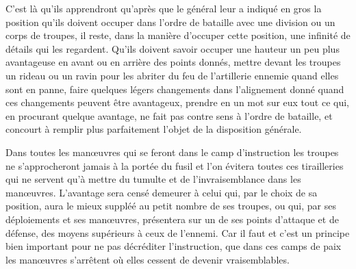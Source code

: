 \documentclass[french,twoside]{book} %
\begin{document}
C’est là qu’ils apprendront qu’après que le général leur a indiqué en gros la position qu’ils doivent occuper dans l’ordre de bataille avec une division ou un corps de troupes, il reste, dans la manière d’occuper cette position, une infinité de détails qui les regardent. Qu’ils doivent savoir occuper une hauteur un peu plus avantageuse en avant ou en arrière des points donnés, mettre devant les troupes un rideau ou un ravin pour les abriter du feu de l’artillerie ennemie quand elles sont en panne, faire quelques légers changements dans l’alignement donné quand ces changements peuvent être avantageux, prendre en un mot sur eux tout ce qui, en procurant quelque avantage, ne fait pas contre sens à l’ordre de bataille, et concourt à remplir plus parfaitement l’objet de la disposition générale.\par
Dans toutes les manœuvres qui se feront dans le camp d’instruction les troupes ne s’approcheront jamais à la portée du fusil et l’on évitera toutes ces tirailleries qui ne servent qu’à mettre du tumulte et de l’invraisemblance dans les manœuvres. L’avantage sera censé demeurer à celui qui, par le choix de sa position, aura le mieux suppléé au petit nombre de ses troupes, ou qui, par ses déploiements et ses manœuvres, présentera sur un de ses points d’attaque et de défense, des moyens supérieurs à ceux de l’ennemi. Car il faut et c’est un principe bien important pour ne pas décréditer l’instruction, que dans ces camps de paix les manœuvres s’arrêtent où elles cessent de devenir vraisemblables.
\end{document}
